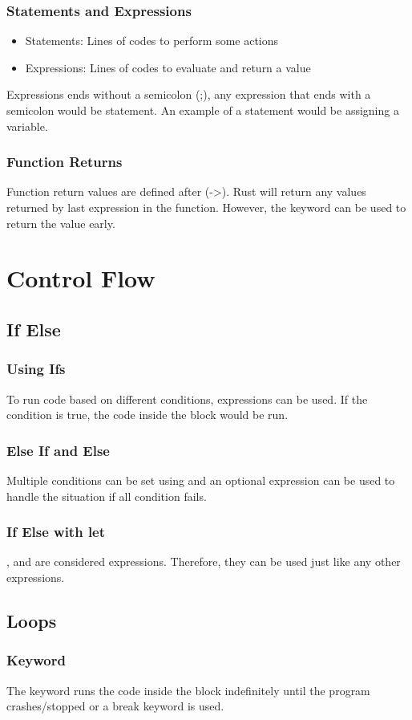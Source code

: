 \documentclass{beamer}
\begin{document}
\begin{frame}
  \frametitle{Statements and Expressions}
  \begin{itemize}
    \item{Statements: Lines of codes to perform some actions}
    \item{Expressions: Lines of codes to evaluate and return a value}
  \end{itemize}
  Expressions ends without a semicolon (;), any expression that ends with a semicolon would be statement. An example of a statement would be assigning a variable.
  
\end{frame}

\begin{frame}
  \frametitle{Function Returns}
  Function return values are defined after (->). Rust will return any values returned by last expression in the function. However, the  keyword can be used to return the value early.
  
\end{frame}

\section{Control Flow}
\subsection{If Else}
\begin{frame}
  \frametitle{Using Ifs}
  To run code based on different conditions,  expressions can be used. If the condition is true, the code inside the block would be run.
  
\end{frame}

\begin{frame}
  \frametitle{Else If and Else}
  Multiple conditions can be set using  and an optional  expression can be used to handle the situation if all condition fails.
  
\end{frame}

\begin{frame}
  \frametitle{If Else with let}
  ,  and  are considered expressions. Therefore, they can be used just like any other expressions.
  
\end{frame}

\subsection{Loops}
\begin{frame}
  \frametitle{ Keyword}
  The  keyword runs the code inside the block indefinitely until the program crashes/stopped or a break keyword is used.
  
\end{frame}
\end{document}
